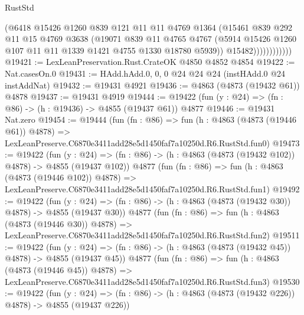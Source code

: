 \begin{lexlean}{RustStd}
\begin{coremodule}
                        (@6418
                          @15426
                          @1260
                          @839
                          @121
                          @11
                          @11
                          @4769
                          @1364
                          (@15461
                            @839
                            @292
                            @11
                            @15
                            @4769
                            @3638
                            (@19071
                              @839
                              @11
                              @4765
                              @4767
                              (@5914
                                @15426
                                @1260
                                @107
                                @11
                                @11
                                @1339
                                @1421
                                @4755
                                @1330
                                @18780
                                @5939))
                            @15482))))))))))))
@19421 := LexLeanPreservation.Rust.CrateOK @4850 @4852 @4854
@19422 := Nat.casesOn.{0}
@19431 := HAdd.hAdd.{0, 0, 0} @24 @24 @24 (instHAdd.{0} @24 instAddNat)
@19432 := @19431 @4921
@19436 := @4863 (@4873 (@19432 @61)) @4878
@19437 := @19431 @4919
@19444 := @19422 (fun (y : @24) => (fn : @86) -> (h : @19436) -> @4855 (@19437 @61)) @4877
@19446 := @19431 Nat.zero
@19454 := @19444
    (fun (fn : @86) =>
    fun (h : @4863 (@4873 (@19446 @61)) @4878) =>
    LexLeanPreserve.C6870e3411add28e5d1450faf7a10250d.R6.RustStd.fun0)
@19473 := @19422
    (fun (y : @24) => (fn : @86) -> (h : @4863 (@4873 (@19432 @102)) @4878) -> @4855 (@19437 @102))
    @4877
    (fun (fn : @86) =>
    fun (h : @4863 (@4873 (@19446 @102)) @4878) =>
    LexLeanPreserve.C6870e3411add28e5d1450faf7a10250d.R6.RustStd.fun1)
@19492 := @19422
    (fun (y : @24) => (fn : @86) -> (h : @4863 (@4873 (@19432 @30)) @4878) -> @4855 (@19437 @30))
    @4877
    (fun (fn : @86) =>
    fun (h : @4863 (@4873 (@19446 @30)) @4878) =>
    LexLeanPreserve.C6870e3411add28e5d1450faf7a10250d.R6.RustStd.fun2)
@19511 := @19422
    (fun (y : @24) => (fn : @86) -> (h : @4863 (@4873 (@19432 @45)) @4878) -> @4855 (@19437 @45))
    @4877
    (fun (fn : @86) =>
    fun (h : @4863 (@4873 (@19446 @45)) @4878) =>
    LexLeanPreserve.C6870e3411add28e5d1450faf7a10250d.R6.RustStd.fun3)
@19530 := @19422
    (fun (y : @24) => (fn : @86) -> (h : @4863 (@4873 (@19432 @226)) @4878) -> @4855 (@19437 @226))

\end{coremodule}
\end{lexlean}
